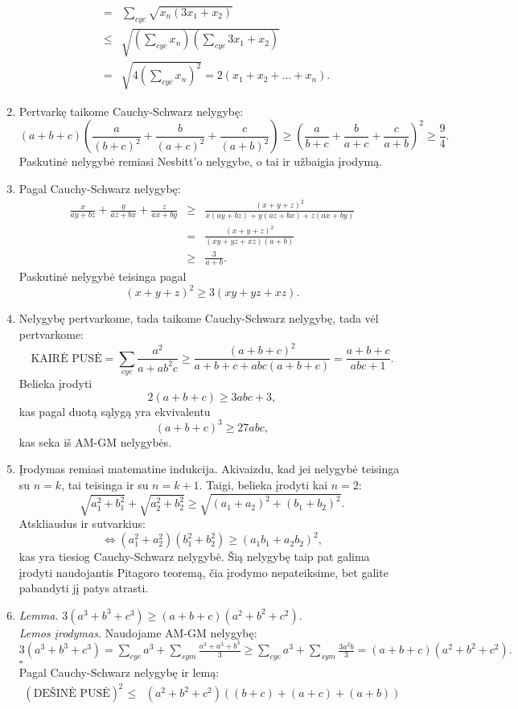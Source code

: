 \begin{enumerate}
\begin{eqnarray*}
&=&\sum_{cyc}{\sqrt{x_n\left(3x_1+x_2\right)}}\\
&\leq&\sqrt{\left(\sum_{cyc}{x_n}\right)\left(\sum_{cyc}{3x_1+x_2}\right)}\\
&=&\sqrt{4\left(\sum_{cyc}{x_n}\right)^2}=2(x_1+x_2+...+x_n).\end{eqnarray*}
\item 
Pertvarkę taikome Cauchy-Schwarz nelygybę:
$$(a+b+c)\left(\frac{a}{(b+c)^2}+\frac{b}{(a+c)^2}+\frac{c}{(a+b)^2}\right)\geq\left(\frac{a}{b+c}+\frac{b}{a+c}+\frac{c}{a+b}\right)^2\geq\frac{9}{4}.$$
Paskutinė nelygybė remiasi Nesbitt'o nelygybe, o tai ir užbaigia
įrodymą.
\item 
Pagal Cauchy-Schwarz nelygybę:
\begin{eqnarray*}\frac{x}{ay+bz}+\frac{y}{az+bx}+\frac{z}{ax+by}&\geq&\frac{(x+y+z)^2}{x(ay+bz)+y(az+bx)+z(ax+by)}\\
&=&\frac{(x+y+z)^2}{(xy+yz+xz)(a+b)}\\&\geq&\frac{3}{a+b}.\end{eqnarray*}
Paskutinė nelygybė teisinga pagal $$(x+y+z)^2\geq3(xy+yz+xz).$$
\item 
Nelygybę pertvarkome, tada taikome Cauchy-Schwarz nelygybę, tada vėl
pertvarkome: $$\text{KAIRĖ
PUSĖ}=\sum_{cyc}{\frac{a^2}{a+ab^2c}}\geq\frac{(a+b+c)^2}{a+b+c+abc(a+b+c)}=\frac{a+b+c}{abc+1}.$$
Belieka įrodyti $$2(a+b+c)\geq3abc+3,$$ kas pagal duotą sąlygą yra
ekvivalentu $$(a+b+c)^3\geq27abc,$$ kas seka iš AM-GM nelygybės.
\item 
Įrodymas remiasi matematine indukcija. Akivaizdu, kad jei nelygybė
teisinga su $n=k$, tai teisinga ir su $n=k+1$. Taigi, belieka įrodyti
kai $n=2$:
$$\sqrt{a_1^2+b_1^2}+\sqrt{a_2^2+b_2^2}\geq\sqrt{(a_1+a_2)^2+(b_1+b_2)^2}.$$
Atskliaudus ir sutvarkius:
$$\Leftrightarrow(a_1^2+a_2^2)(b_1^2+b_2^2)\geq(a_1b_1+a_2b_2)^2,$$
kas yra tiesiog Cauchy-Schwarz nelygybė.
Šią nelygybę taip pat galima įrodyti naudojantis Pitagoro teoremą, čia
įrodymo nepateiksime, bet galite pabandyti jį patys atrasti.
\item 
\textit{Lemma.} $3(a^3+b^3+c^3)\geq(a+b+c)(a^2+b^2+c^2)$.\\
\noindent\textit{Lemos įrodymas.} Naudojame AM-GM nelygybę:
$3(a^3+b^3+c^3)=\sum\limits_{cyc}{a^3}+\sum\limits_{sym}{\frac{a^3+a^3+b^3}{3}}\geq\sum\limits_{cyc}{a^3}+\sum\limits_{sym}{\frac{3a^2b}{3}}=(a+b+c)(a^2+b^2+c^2).$\hfill{$\square$}
\\Pagal Cauchy-Schwarz nelygybę ir lemą:
\begin{eqnarray*}(\text{DEŠINĖ
PUSĖ})^2&\leq&(a^2+b^2+c^2)((b+c)+(a+c)+(a+b))\\

\end{eqnarray*}
\end{enumerate}
